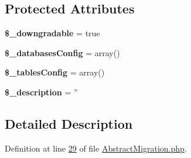 \subsection*{\-Protected \-Attributes}
\begin{DoxyCompactItemize}
\item 
\hypertarget{classZendDbSchema__Db__Migration__AbstractMigration_a8daac01e9131469e3e19794a65b550eb}{{\bfseries \$\-\_\-downgradable} = true}\label{classZendDbSchema__Db__Migration__AbstractMigration_a8daac01e9131469e3e19794a65b550eb}

\item 
\hypertarget{classZendDbSchema__Db__Migration__AbstractMigration_a450094d2e60b7d367397a641cdea5d5e}{{\bfseries \$\-\_\-databases\-Config} = array()}\label{classZendDbSchema__Db__Migration__AbstractMigration_a450094d2e60b7d367397a641cdea5d5e}

\item 
\hypertarget{classZendDbSchema__Db__Migration__AbstractMigration_a27687afe1e246c2779785db56ba6730a}{{\bfseries \$\-\_\-tables\-Config} = array()}\label{classZendDbSchema__Db__Migration__AbstractMigration_a27687afe1e246c2779785db56ba6730a}

\item 
\hypertarget{classZendDbSchema__Db__Migration__AbstractMigration_a9887e1ed9d43f24b5932d5a25dacf331}{{\bfseries \$\-\_\-description} = ''}\label{classZendDbSchema__Db__Migration__AbstractMigration_a9887e1ed9d43f24b5932d5a25dacf331}

\end{DoxyCompactItemize}


\subsection{\-Detailed \-Description}


\-Definition at line \hyperlink{AbstractMigration_8php_source_l00029}{29} of file \hyperlink{AbstractMigration_8php_source}{\-Abstract\-Migration.\-php}.



